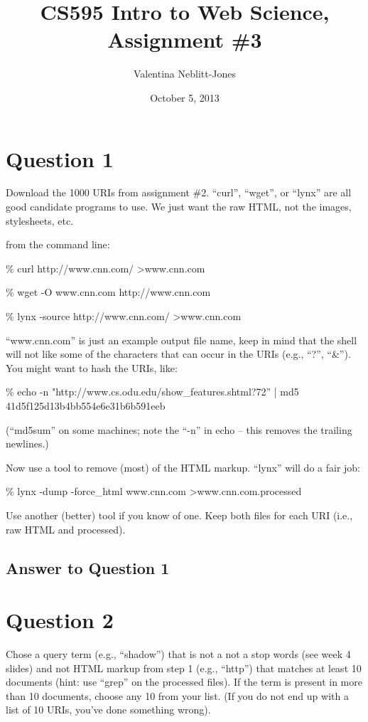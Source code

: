 \documentclass{article}
\begin{document}

\title{CS595 Intro to Web Science, Assignment \#3}
\author{Valentina Neblitt-Jones}
\date{October 5, 2013}
\maketitle

\section*{Question 1}

Download the 1000 URIs from assignment \#2. ``curl'', ``wget'', or ``lynx'' are all good candidate programs to use. We just want the raw HTML, not the images, stylesheets, etc.

from the command line:

\% curl http://www.cnn.com/  \textgreater  www.cnn.com

\% wget -O www.cnn.com http://www.cnn.com

\% lynx -source http://www.cnn.com/ \textgreater www.cnn.com

``www.cnn.com'' is just an example output file name, keep in mind that the shell will not like some of the characters that can occur in the URIs (e.g., ``?'', ``\&''). You might want to hash the URIs, like:

\% echo -n "http://www.cs.odu.edu/show\_features.shtml?72'' | md5
41d5f125d13b4bb554e6e31b6b591eeb

(``md5sum'' on some machines; note the ``-n'' in echo -- this removes the trailing newlines.)

Now use a tool to remove (most) of the HTML markup. ``lynx'' will do a fair job:

\% lynx -dump -force\_html www.cnn.com \textgreater www.cnn.com.processed

Use another (better) tool if you know of one. Keep both files for each URI (i.e., raw HTML and processed).

\subsection*{Answer to Question 1}

\section*{Question 2}

Chose a query term (e.g., ``shadow'') that is not a not a stop words (see week 4 slides) and not HTML markup from step 1 (e.g., ``http'') that matches at least 10 documents (hint: use ``grep'' on the processed files). If the term is present in more than 10 documents, choose any 10 from your list. (If you do not end up with a list of 10 URIs, you've done something wrong).
\end{document}
